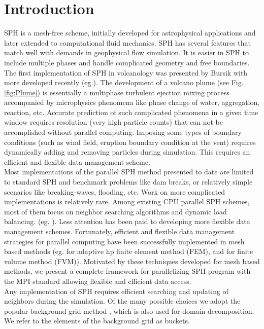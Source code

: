 \documentclass[procedia]{easychair}
\begin{document}
\section{Introduction}
\label{sect:introduction}
SPH is a mesh-free scheme, initially developed for astrophysical applications and later extended to computational fluid mechanics. SPH has several features that match well with demands in geophysical flow simulation. It is easier in SPH to include multiple phases and handle complicated geometry and free boundaries. The first implementation of SPH in volcanology was presented by Bursik \cite{bursik2003smoothed} with more developed recently (eg.\cite{ haddad2016smoothed}). The development  of a volcano plume (see Fig. \ref{fig:Plume}) is essentially a multiphase turbulent ejection mixing process accompanied by microphysics phenomena like phase change of water, aggregation, reaction, etc. Accurate prediction of such complicated phenomena in a given time window requires resolution (very high particle counts) that can not be accomplished without parallel computing. Imposing  some types of boundary conditions (such as wind field, eruption boundary condition at the vent) requires dynamically adding and removing particles during simulation. This requires an efficient and flexible data management scheme.\\
Most implementations of the parallel SPH method presented to date are limited to standard SPH and benchmark problems like dam breaks, or relatively
simple scenarios like breaking-waves, flooding, etc. Work on more complicated implementations is relatively rare. Among existing CPU parallel SPH schemes, most of them focus on neighbor searching algorithms and dynamic load balancing. (eg. \cite{ferrari2009new, crespo2015dualsphysics}). Less attention has been paid to developing more flexible data management schemes. 
Fortunately, efficient and flexible data management strategies for parallel computing have been successfully implemented in mesh based methods (eg. \cite{laszloffy2000simple} for adaptive hp finite element method (FEM), and \cite{patra2005parallel} for finite volume method (FVM)). Motivated by these techniques developed for mesh based methods, we present a complete framework for parallelizing SPH program with the MPI standard allowing flexible and efficient data access.\\
Any implementation of SPH requires efficient searching and updating of neighbors during the simulation. Of the many possible choices we adopt the popular background grid method \cite{monaghan1985refined}, which is also used for domain decomposition. We refer to the elements of the background grid as buckets. 
\end{document}
